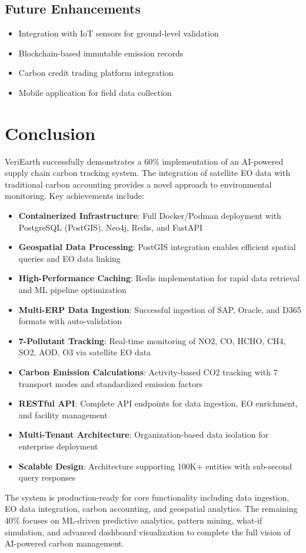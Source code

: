 \documentclass[11pt,a4paper]{article}
\begin{document}
\subsection{Future Enhancements}

\begin{itemize}
    \item Integration with IoT sensors for ground-level validation
    \item Blockchain-based immutable emission records
    \item Carbon credit trading platform integration
    \item Mobile application for field data collection
\end{itemize}

\section{Conclusion}

VeriEarth successfully demonstrates a 60\% implementation of an AI-powered supply chain carbon tracking system. The integration of satellite EO data with traditional carbon accounting provides a novel approach to environmental monitoring. Key achievements include:

\begin{itemize}
    \item \textbf{Containerized Infrastructure}: Full Docker/Podman deployment with PostgreSQL (PostGIS), Neo4j, Redis, and FastAPI
    \item \textbf{Geospatial Data Processing}: PostGIS integration enables efficient spatial queries and EO data linking
    \item \textbf{High-Performance Caching}: Redis implementation for rapid data retrieval and ML pipeline optimization
    \item \textbf{Multi-ERP Data Ingestion}: Successful ingestion of SAP, Oracle, and D365 formats with auto-validation
    \item \textbf{7-Pollutant Tracking}: Real-time monitoring of NO2, CO, HCHO, CH4, SO2, AOD, O3 via satellite EO data
    \item \textbf{Carbon Emission Calculations}: Activity-based CO2 tracking with 7 transport modes and standardized emission factors
    \item \textbf{RESTful API}: Complete API endpoints for data ingestion, EO enrichment, and facility management
    \item \textbf{Multi-Tenant Architecture}: Organization-based data isolation for enterprise deployment
    \item \textbf{Scalable Design}: Architecture supporting 100K+ entities with sub-second query responses
\end{itemize}

The system is production-ready for core functionality including data ingestion, EO data integration, carbon accounting, and geospatial analytics. The remaining 40\% focuses on ML-driven predictive analytics, pattern mining, what-if simulation, and advanced dashboard visualization to complete the full vision of AI-powered carbon management.
\end{document}
